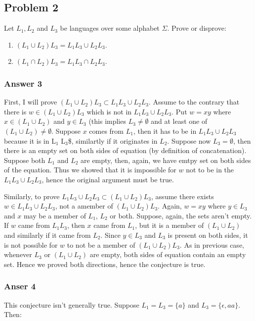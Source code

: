\documentclass[11pt]{article}
\begin{document}
\subsection{Problem 2}
\label{sec:orgheadline6}
Let \(L_1, L_2\) and \(L_3\) be languages over some alphabet \(\Sigma\).
Prove or disprove:
\begin{enumerate}
\item \((L_1 \cup L_2) L_3 = L_1 L_3 \cup L_2 L_3\).
\item \((L_1 \cap L_2) L_3 = L_1 L_3 \cap L_2 L_3\).
\end{enumerate}

\subsubsection{Answer 3}
\label{sec:orgheadline4}
First, I will prove \((L_1 \cup L_2) L_3 \subset L_1 L_3 \cup L_2 L_3\).
Assume to the contrary that there is \(w \in (L_1 \cup L_2) L_3\) which is not
in \(L_1 L_3 \cup L_2 L_3\).  Put \(w = xy\) where \(x \in (L_1 \cup L_2)\) and \(y
    \in L_3\) (this implies \(L_3 \neq \emptyset\) and at least one of \((L_1 \cup
    L_2) \neq \emptyset\).  Suppose \(x\) comes from \(L_1\), then it has to be in
\(L_1 L_3 \cup L_2 L_3\) because it is in L\(_{\text{1}}\) L\(_{\text{3}}\)\$, similartly if it originates
in \(L_2\).  Suppose now \(L_3 = \emptyset\), then there is an empty set on
both sides of equation (by definition of concatenation).  Suppose both \(L_1\)
and \(L_2\) are empty, then, again, we have emtpy set on both sides of the
equation.  Thus we showed that it is impossible for \(w\) not to be in the
\(L_1 L_3 \cup L_2 L_3\), hence the original argument must be true.

Similarly, to prove \(L_1 L_3 \cup L_2 L_3 \subset (L_1 \cup L_2) L_3\),
assume there exists \(w \in L_1 L_3 \cup L_2 L_3\), not a amember of \((L_1
    \cup L_2) L_3\).  Again, \(w = xy\) where \(y \in L_3\) and \(x\) may be a
member of \(L_1\), \(L_2\) or both.  Suppose, again, the sets aren't empty.
If \(w\) came from \(L_1 L_3\), then \(x\) came from \(L_1\), but it is a member
of \((L_1 \cup L_2)\) and similarly if it came from \(L_2\).  Since \(y \in L_3\)
and \(L_3\) is present on both sides, it is not possible for \(w\) to not
be a member of \((L_1 \cup L_2) L_3\).  As in previous case, whenever \(L_3\)
or \((L_1 \cup L_2)\) are empty, both sides of equation contain an empty set.
Hence we proved both directions, hence the conjecture is true.

\subsubsection{Anser 4}
\label{sec:orgheadline5}
This conjecture isn't generally true.  Suppose \(L_1 = L_3 = \{a\}\) and
\(L_3 = \{\epsilon, aa\}\).  Then:
\end{document}
